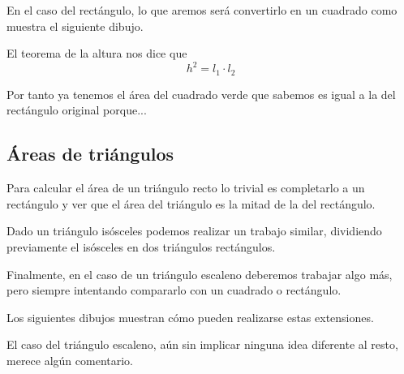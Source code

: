 \documentclass{apuntes}
\begin{document}
En el caso del rectángulo, lo que aremos será convertirlo en un cuadrado como muestra el siguiente dibujo.

\begin{minipage}{0.4\textwidth}
\begin{center}
\end{center}
\end{minipage}
\begin{minipage}{0.55\textwidth}
El teorema de la altura nos dice que
\[h^2=l_1\cdot l_2\]

Por tanto ya tenemos el área del cuadrado verde que sabemos es igual a la del rectángulo original porque...
\end{minipage}

\subsection{Áreas de triángulos}

Para calcular el área de un triángulo recto lo trivial es completarlo a un rectángulo y ver que el área del triángulo es la mitad de la del rectángulo.

Dado un triángulo isósceles podemos realizar un trabajo similar, dividiendo previamente el isósceles en dos triángulos rectángulos.

Finalmente, en el caso de un triángulo escaleno deberemos trabajar algo más, pero siempre intentando compararlo con un cuadrado o rectángulo.

Los siguientes dibujos muestran cómo pueden realizarse estas extensiones.

\begin{minipage}{0.33\textwidth}
\begin{center}
\end{center}
\end{minipage}
\begin{minipage}{0.33\textwidth}
\begin{center}
\end{center}
\end{minipage}
\begin{minipage}{0.33\textwidth}
\begin{center}
\end{center}
\end{minipage}

El caso del triángulo escaleno, aún sin implicar ninguna idea diferente al resto, merece algún comentario.
\end{document}
